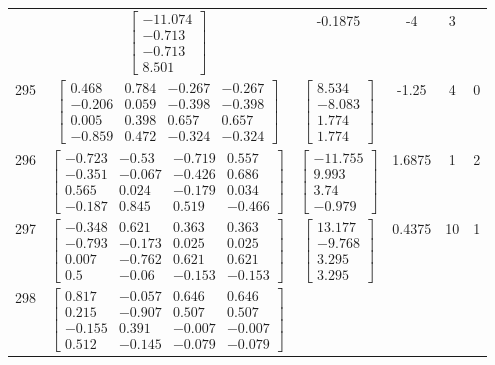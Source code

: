 \documentclass[a4paper,12pt]{article}
\begin{document}
\begin{tabular}{c c c c c c}
&
$\begin{bmatrix} -11.074 \\ -0.713 \\ -0.713 \\ 8.501 \end{bmatrix}$
&
-0.1875
&
-4
&
3
\\
295
&
$\begin{bmatrix} 0.468 & 0.784 & -0.267 & -0.267 \\ -0.206 & 0.059 & -0.398 & -0.398 \\ 0.005 & 0.398 & 0.657 & 0.657 \\ -0.859 & 0.472 & -0.324 & -0.324 \end{bmatrix}$
&
$\begin{bmatrix} 8.534 \\ -8.083 \\ 1.774 \\ 1.774 \end{bmatrix}$
&
-1.25
&
4
&
0
\\
296
&
$\begin{bmatrix} -0.723 & -0.53 & -0.719 & 0.557 \\ -0.351 & -0.067 & -0.426 & 0.686 \\ 0.565 & 0.024 & -0.179 & 0.034 \\ -0.187 & 0.845 & 0.519 & -0.466 \end{bmatrix}$
&
$\begin{bmatrix} -11.755 \\ 9.993 \\ 3.74 \\ -0.979 \end{bmatrix}$
&
1.6875
&
1
&
2
\\
297
&
$\begin{bmatrix} -0.348 & 0.621 & 0.363 & 0.363 \\ -0.793 & -0.173 & 0.025 & 0.025 \\ 0.007 & -0.762 & 0.621 & 0.621 \\ 0.5 & -0.06 & -0.153 & -0.153 \end{bmatrix}$
&
$\begin{bmatrix} 13.177 \\ -9.768 \\ 3.295 \\ 3.295 \end{bmatrix}$
&
0.4375
&
10
&
1
\\
298
&
$\begin{bmatrix} 0.817 & -0.057 & 0.646 & 0.646 \\ 0.215 & -0.907 & 0.507 & 0.507 \\ -0.155 & 0.391 & -0.007 & -0.007 \\ 0.512 & -0.145 & -0.079 & -0.079 \end{bmatrix}$

\end{tabular}
\end{document}
